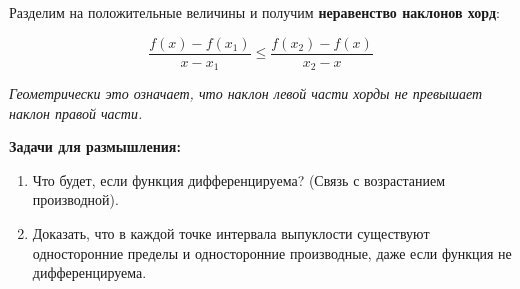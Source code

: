 \documentclass[12pt, a4paper]{article}
\begin{document}
Разделим на положительные величины и получим \textbf{неравенство наклонов хорд}:
\begin{tcolorbox}
\[
\boxed{ \frac{f(x) - f(x_1)}{x - x_1} \leq \frac{f(x_2) - f(x)}{x_2 - x} }
\]
\end{tcolorbox}
\textit{Геометрически это означает, что наклон левой части хорды не превышает наклон правой части.}

\vspace{1cm}
\textbf{Задачи для размышления:}
\begin{enumerate}
    \item Что будет, если функция дифференцируема? (Связь с возрастанием производной).
    \item Доказать, что в каждой точке интервала выпуклости существуют односторонние пределы и односторонние производные, даже если функция не дифференцируема.
\end{enumerate}
\end{document}
